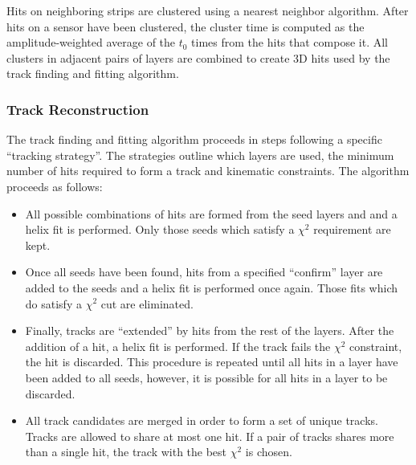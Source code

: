 Hits on neighboring strips are clustered using a nearest neighbor
algorithm.
After hits on a sensor have been
clustered, the cluster time is computed as the amplitude-weighted average
of the $t_0$ times from the hits that compose it. All clusters in adjacent pairs
of layers are combined to create 3D hits used by the track finding and fitting
algorithm.

\subsubsection{Track Reconstruction}

The track finding and fitting algorithm proceeds in steps following a specific 
``tracking strategy''.  The strategies outline which layers are used, the 
minimum number of hits required to form a track and kinematic constraints.  
The algorithm proceeds as follows:
\begin{itemize}
    \item All possible combinations of hits are formed from the seed layers and
          and a helix fit is performed.  Only those seeds which satisfy a 
          $\chi^2$ requirement are kept. 
    \item Once all seeds have been found, hits from a specified ``confirm'' 
          layer are added to the seeds and a helix fit is performed once again.
          Those fits which do satisfy a $\chi^2$ cut are eliminated.
    \item Finally, tracks are ``extended'' by hits from the rest of the layers.
          After the addition of a hit, a helix fit is performed.  If the track
          fails the $\chi^2$ constraint, the hit is discarded.  This procedure
          is repeated until all hits in a layer have been added to all seeds, 
          however, it is possible for all hits in a layer to be discarded.
    \item All track candidates are merged in order to form a set of unique 
          tracks.  Tracks are allowed to share at most one hit.  If a pair of
          tracks shares more than a single hit, the track with the best $\chi^2$ 
          is chosen. 
\end{itemize}
